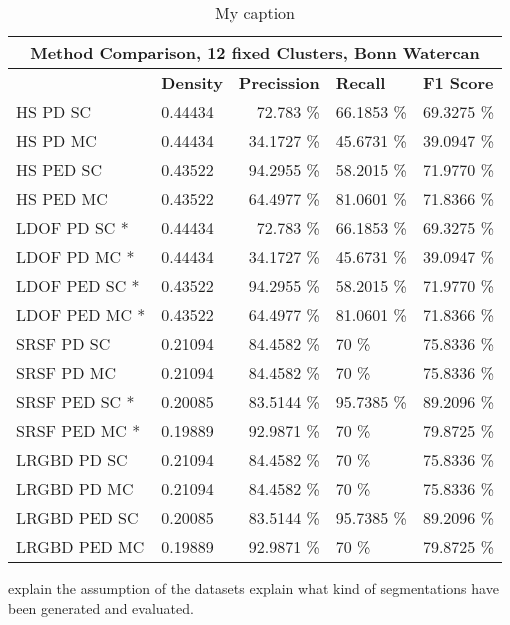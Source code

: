 \begin{table}[]
\centering
\begin{tabular}{|l|l|r|l|l|}
\hline
\multicolumn{5}{|c|}{Method Comparison, 12 fixed Clusters, Bonn Watercan}                        \\ \hline
              & \textbf{Density} & \textbf{Precission} & \textbf{Recall} & \textbf{F1 Score} \\ \hline
HS PD SC & 0.44434 & 72.783 \%   & 66.1853 \%     & 69.3275 \%  \\ \hline
HS PD MC & 0.44434 & 34.1727 \%   & 45.6731 \%     & 39.0947 \%  \\ \hline              
HS PED SC & 0.43522 & 94.2955 \%   & 58.2015 \%     & 71.9770 \%  \\ \hline
HS PED MC & 0.43522 & 64.4977 \%   & 81.0601 \%     & 71.8366 \%  \\ \hline            
LDOF PD SC * & 0.44434 & 72.783 \%   & 66.1853 \%     & 69.3275 \%  \\ \hline
LDOF PD MC * & 0.44434 & 34.1727 \%   & 45.6731 \%     & 39.0947 \%  \\ \hline              
LDOF PED SC * & 0.43522 & 94.2955 \%   & 58.2015 \%     & 71.9770 \%  \\ \hline
LDOF PED MC * & 0.43522 & 64.4977 \%   & 81.0601 \%     & 71.8366 \%  \\ \hline
SRSF PD SC & 0.21094 & 84.4582 \%   & 70 \%     & 75.8336 \%  \\ \hline
SRSF PD MC & 0.21094 & 84.4582 \%   & 70 \%     & 75.8336 \%  \\ \hline
SRSF PED SC * & 0.20085 & 83.5144 \%   & 95.7385 \%     & 89.2096 \%  \\ \hline
SRSF PED MC * & 0.19889 & 92.9871 \%   & 70 \%     & 79.8725 \%  \\ \hline
LRGBD PD SC & 0.21094 & 84.4582 \%   & 70 \%     & 75.8336 \%  \\ \hline
LRGBD PD MC & 0.21094 & 84.4582 \%   & 70 \%     & 75.8336 \%  \\ \hline
LRGBD PED SC & 0.20085 & 83.5144 \%   & 95.7385 \%     & 89.2096 \%  \\ \hline
LRGBD PED MC & 0.19889 & 92.9871 \%   & 70 \%     & 79.8725 \%  \\ \hline
\end{tabular}
\caption[Method Comparision Bonn Watercan]{My caption}
\label{tab:bonn_wc_methods}
\end{table}


explain the assumption of the datasets
explain what kind of segmentations have been generated and evaluated.







